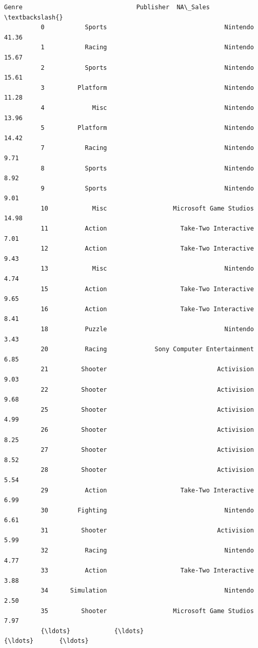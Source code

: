 \documentclass[11pt]{article}
\begin{document}
\begin{Verbatim}[commandchars=\\\{\}]
                       Genre                               Publisher  NA\_Sales  \textbackslash{}
          0           Sports                                Nintendo     41.36   
          1           Racing                                Nintendo     15.67   
          2           Sports                                Nintendo     15.61   
          3         Platform                                Nintendo     11.28   
          4             Misc                                Nintendo     13.96   
          5         Platform                                Nintendo     14.42   
          7           Racing                                Nintendo      9.71   
          8           Sports                                Nintendo      8.92   
          9           Sports                                Nintendo      9.01   
          10            Misc                  Microsoft Game Studios     14.98   
          11          Action                    Take-Two Interactive      7.01   
          12          Action                    Take-Two Interactive      9.43   
          13            Misc                                Nintendo      4.74   
          15          Action                    Take-Two Interactive      9.65   
          16          Action                    Take-Two Interactive      8.41   
          18          Puzzle                                Nintendo      3.43   
          20          Racing             Sony Computer Entertainment      6.85   
          21         Shooter                              Activision      9.03   
          22         Shooter                              Activision      9.68   
          25         Shooter                              Activision      4.99   
          26         Shooter                              Activision      8.25   
          27         Shooter                              Activision      8.52   
          28         Shooter                              Activision      5.54   
          29          Action                    Take-Two Interactive      6.99   
          30        Fighting                                Nintendo      6.61   
          31         Shooter                              Activision      5.99   
          32          Racing                                Nintendo      4.77   
          33          Action                    Take-Two Interactive      3.88   
          34      Simulation                                Nintendo      2.50   
          35         Shooter                  Microsoft Game Studios      7.97   
          {\ldots}            {\ldots}                                     {\ldots}       {\ldots}   

\end{Verbatim}
\end{document}
